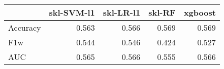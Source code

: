 \begin{tabular}{lrrrr}
\toprule
{} &  skl-SVM-l1 &  skl-LR-l1 &  skl-RF &  xgboost \\
\midrule
Accuracy &       0.563 &      0.566 &   0.569 &    0.569 \\
F1w      &       0.544 &      0.546 &   0.424 &    0.527 \\
AUC      &       0.565 &      0.566 &   0.555 &    0.566 \\
\bottomrule
\end{tabular}

